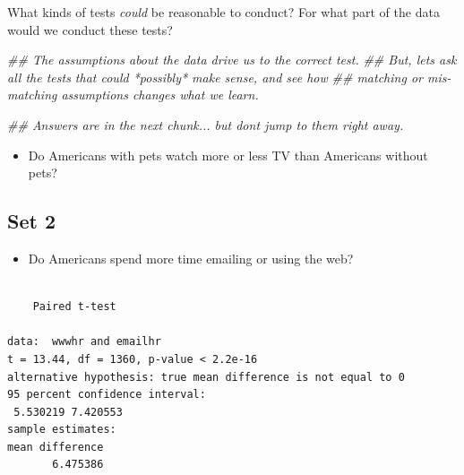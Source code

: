 \documentclass[
  letterpaper,
  DIV=11,
  numbers=noendperiod]{scrreprt}
\newenvironment{Shaded}{\begin{snugshade}}{\end{snugshade}}
\newcommand{\AttributeTok}[1]{\textcolor[rgb]{0.40,0.45,0.13}{#1}}
\newcommand{\ConstantTok}[1]{\textcolor[rgb]{0.56,0.35,0.01}{#1}}
\newcommand{\DocumentationTok}[1]{\textcolor[rgb]{0.37,0.37,0.37}{\textit{#1}}}
\newcommand{\FunctionTok}[1]{\textcolor[rgb]{0.28,0.35,0.67}{#1}}
\newcommand{\NormalTok}[1]{\textcolor[rgb]{0.00,0.23,0.31}{#1}}
\newcommand{\SpecialCharTok}[1]{\textcolor[rgb]{0.37,0.37,0.37}{#1}}
\providecommand{\tightlist}{%
  \setlength{\itemsep}{0pt}\setlength{\parskip}{0pt}}\usepackage{longtable,booktabs,array}
\begin{document}
What kinds of tests \emph{could} be reasonable to conduct? For what part
of the data would we conduct these tests?

\begin{Shaded}
\begin{Highlighting}[]
\DocumentationTok{\#\# The assumptions about the data drive us to the correct test. }
\DocumentationTok{\#\# But, let\textquotesingle{}s ask all the tests that could *possibly* make sense, and see how }
\DocumentationTok{\#\#     matching or mis{-}matching assumptions changes what we learn. }

\DocumentationTok{\#\# Answers are in the next chunk... but don\textquotesingle{}t jump to them right away. }
\end{Highlighting}
\end{Shaded}

\begin{itemize}
\tightlist
\item
  Do Americans with pets watch more or less TV than Americans without
  pets?
\end{itemize}

\subsection{Set 2}\label{set-2}

\begin{itemize}
\tightlist
\item
  Do Americans spend more time emailing or using the web?
\end{itemize}

\begin{Shaded}
\end{Shaded}

\begin{verbatim}

    Paired t-test

data:  wwwhr and emailhr
t = 13.44, df = 1360, p-value < 2.2e-16
alternative hypothesis: true mean difference is not equal to 0
95 percent confidence interval:
 5.530219 7.420553
sample estimates:
mean difference 
       6.475386 
\end{verbatim}
\end{document}
